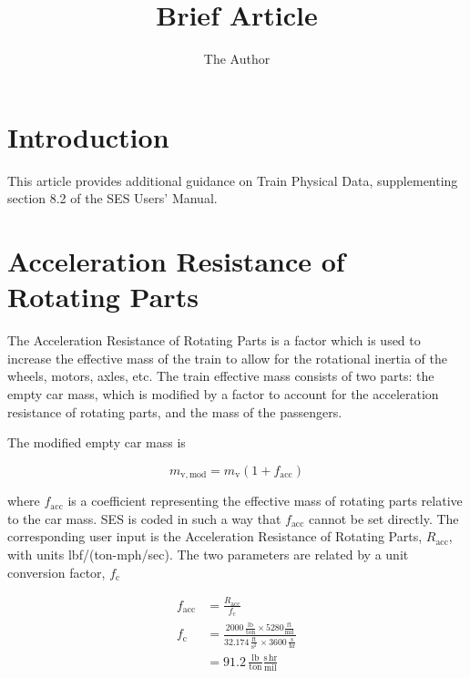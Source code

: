 \documentclass[11pt]{article} %
\title{Brief Article}
\author{The Author}
\begin{document}

\section{Introduction}

This article provides additional guidance on Train Physical Data, supplementing section 8.2 of the SES Users' Manual.

\section{Acceleration Resistance of Rotating Parts}

The Acceleration Resistance of Rotating Parts is a factor which is used to increase the effective mass of the train to allow for the rotational inertia of the wheels, motors, axles, etc. 
The train effective mass consists of two parts: the empty car mass, which is modified by a factor to account for the acceleration resistance of rotating parts, and the mass of the passengers. 

The modified empty car mass is

\begin{equation}
m_\mathrm{v,mod} = m_\mathrm{v} \left(1 + f_\mathrm{acc}\right)
\label{eqn_effective_mass}
\end{equation}

\noindent where $f_\mathrm{acc}$ is a coefficient representing the effective mass of rotating parts relative to the car mass.
SES is coded in such a way that $f_\mathrm{acc}$ cannot be set directly. 
The corresponding user input is the Acceleration Resistance of Rotating Parts, $R_\mathrm{acc}$, with units lbf/(ton-mph/sec).
The two parameters are related by a unit conversion factor, $f_\mathrm{c}$

\begin{align} \label{eqn_acc_resistance}
f_\mathrm{acc} &= \frac{R_\mathrm{acc}}{f_\mathrm{c}} \\
f_\mathrm{c} &= \frac{2000 \, \frac{\mathrm{lb} }{\mathrm{ton} } \times 5280 \frac{\mathrm{ft} }{\mathrm{mil} }}{32.174 \, \frac{\mathrm{ft}}{\mathrm s^2} \, \times 3600 \, \frac{\mathrm{s}}{\mathrm{hr}} } \\
 &= 91.2 \, \frac{\mathrm{lb}}{\mathrm{ton} } \frac{\mathrm {s \, hr}}{\mathrm{mil} }
\end{align}
\end{document}
